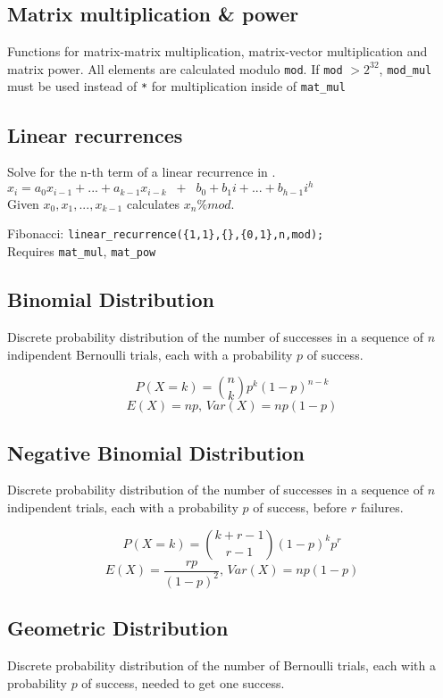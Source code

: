 \subsection{Matrix multiplication \& power}
Functions for matrix-matrix multiplication, matrix-vector multiplication and matrix power. All elements are calculated modulo \verb|mod|. If \verb|mod| $> 2^{32}$, \verb|mod_mul| must be used instead of \verb|*| for multiplication inside of \verb|mat_mul|


\subsection{Linear recurrences}
Solve for the n-th term of a linear recurrence in .\\
$x_i = a_0 x_{i-1} + ... + a_{k-1} x_{i-k} \;\; + \;\; b_0 + b_1 i + ... + b_{h-1} i^h$ \\
Given $x_0, x_1, ..., x_{k-1}$ calculates $x_n \% mod$.

Fibonacci: \texttt{linear\_recurrence(\{1,1\},\{\},\{0,1\},n,mod);}\\
Requires \verb|mat_mul|, \verb|mat_pow|



\subsection{Binomial Distribution}
Discrete probability distribution of the number of successes in a sequence
of $n$ indipendent Bernoulli trials, each with a probability $p$ of success.

\[P(X = k) = \binom{n}{k}p^k(1 - p)^{n - k}\]
\[E(X) = np,\,Var(X) = np(1 - p)\]


\subsection{Negative Binomial Distribution}
Discrete probability distribution of the number of successes in a sequence
of $n$ indipendent trials, each with a probability $p$ of success,
before $r$ failures.

\[P(X = k) = \binom{k + r - 1}{r - 1}(1 - p)^kp^r\]
\[E(X) = \frac{rp}{(1 - p)^2},\,Var(X) = np(1 - p)\]


\subsection{Geometric Distribution}
Discrete probability distribution of the number of Bernoulli trials,
each with a probability $p$ of success, needed to get one success.

